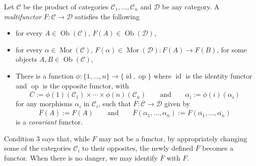 \documentclass[12pt]{article}
\begin{document}
Let $\mathcal{C}$ be the product of categories $\mathcal{C}_1,\ldots,\mathcal{C}_n$ and $\mathcal{D}$ be any category.  A \emph{multifunctor} $F:\mathcal{C}\to \mathcal{D}$ satisfies the following
\begin{itemize}
\item for every $A\in\operatorname{Ob}(\mathcal{C})$, $F(A)\in \operatorname{Ob}(\mathcal{D})$,
\item for every $\alpha\in \operatorname{Mor}(\mathcal{C})$, $F(\alpha)\in \operatorname{Mor}(\mathcal{D}): F(A)\to F(B)$, for some objects $A,B\in \operatorname{Ob}(\mathcal{C})$,
\item There is a function $\phi: \lbrace 1,\ldots, n\rbrace\to \lbrace \operatorname{id},\operatorname{op}\rbrace$ where $\operatorname{id}$ is the identity functor and $\operatorname{op}$ is the opposite functor, with $$\overline{C}:= \phi(1)(\mathcal{C}_1) \times \cdots \times \phi(n)(\mathcal{C}_n)\qquad\mbox{and}\qquad \overline{\alpha_i}:=\phi(i)(\alpha_i)$$ for any morphisms $\alpha_i$ in $\mathcal{C}_i$, such that $\overline{F}: \overline{\mathcal{C}}\to \mathcal{D}$ given by 
$$\overline{F}(A):=F(A)\qquad\mbox{and}\qquad \overline{F}(\alpha_1,\ldots,\alpha_n):=F(\overline{\alpha_1},\ldots, \overline{\alpha_n})$$ is a \emph{covariant} functor. 
\end{itemize}
Condition 3 says that, while $F$ may not be a functor, by appropriately changing some of the categories $\mathcal{C}_i$ to their opposites, the newly defined $\overline{F}$ becomes a functor.  When there is no danger, we may identify $\overline{F}$ with $F$.
\end{document}
